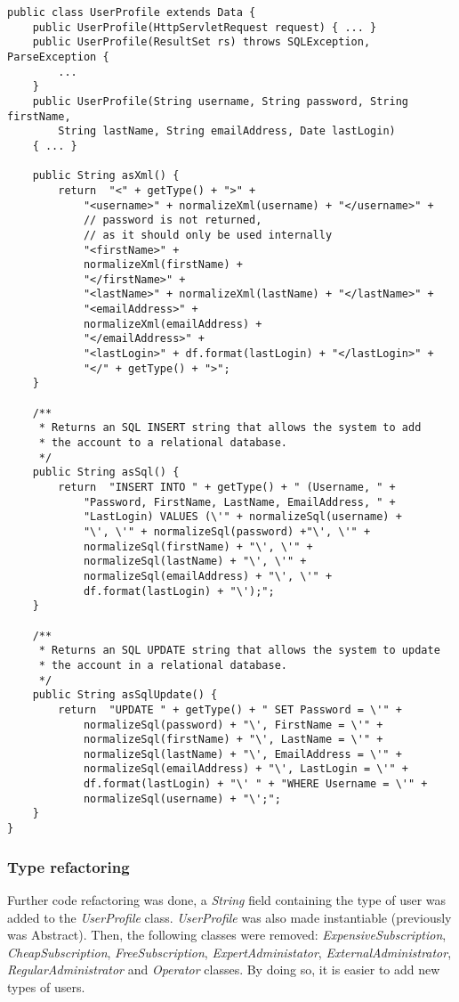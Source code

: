 \begin{lstlisting}
public class UserProfile extends Data {
	public UserProfile(HttpServletRequest request) { ... }
    public UserProfile(ResultSet rs) throws SQLException, ParseException {
        ...
    }
    public UserProfile(String username, String password, String firstName,
		String lastName, String emailAddress, Date lastLogin)
    { ... }
        
    public String asXml() {
		return	"<" + getType() + ">" +
			"<username>" + normalizeXml(username) + "</username>" +
			// password is not returned,
			// as it should only be used internally
			"<firstName>" +
			normalizeXml(firstName) +
			"</firstName>" +
			"<lastName>" + normalizeXml(lastName) + "</lastName>" +
			"<emailAddress>" +
			normalizeXml(emailAddress) +
			"</emailAddress>" +
			"<lastLogin>" + df.format(lastLogin) + "</lastLogin>" +
			"</" + getType() + ">";
	}

	/**
	 * Returns an SQL INSERT string that allows the system to add
	 * the account to a relational database.
	 */
	public String asSql() {
		return	"INSERT INTO " + getType() + " (Username, " +
			"Password, FirstName, LastName, EmailAddress, " +
			"LastLogin) VALUES (\'" + normalizeSql(username) +
			"\', \'" + normalizeSql(password) +"\', \'" +
			normalizeSql(firstName) + "\', \'" +
			normalizeSql(lastName) + "\', \'" +
			normalizeSql(emailAddress) + "\', \'" +
			df.format(lastLogin) + "\');";
	}

	/**
	 * Returns an SQL UPDATE string that allows the system to update
	 * the account in a relational database.
	 */
	public String asSqlUpdate() {
		return  "UPDATE " + getType() + " SET Password = \'" +
			normalizeSql(password) + "\', FirstName = \'" +
			normalizeSql(firstName) + "\', LastName = \'" +
			normalizeSql(lastName) + "\', EmailAddress = \'" +
			normalizeSql(emailAddress) + "\', LastLogin = \'" +
			df.format(lastLogin) + "\' " + "WHERE Username = \'" +
			normalizeSql(username) + "\';";
	}
}
\end{lstlisting}

\subsubsection{Type refactoring}

Further code refactoring was done, a \emph{String} field containing
the type of user was added to the \emph{UserProfile} class.
\emph{UserProfile} was also made instantiable (previously was Abstract).
Then, the following classes were removed: \emph{ExpensiveSubscription},
\emph{CheapSubscription}, \emph{FreeSubscription},
\emph{ExpertAdministator}, \emph{ExternalAdministrator},
\emph{RegularAdministrator} and \emph{Operator} classes. By doing so, it
is easier to add new types of users.\\

